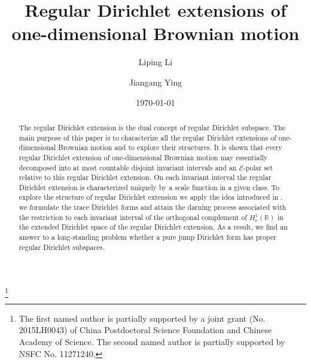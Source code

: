 \documentclass[a4paper]{amsart}
\theoremstyle{definition}
\theoremstyle{remark}
\numberwithin{equation}{section}
\begin{document}
\title[Regular Dirichlet extension]{Regular Dirichlet extensions of one-dimensional Brownian motion}

\author{ Liping Li}
\address{Institute of Applied Mathematics, Academy of Mathematics and Systems Science, Chinese Academy of Sciences, Beijing 100190, China.}
\thanks{The first named author is partially supported by a joint grant (No. 2015LH0043) of China Postdoctoral Science Foundation and Chinese Academy of Science. The second named author is partially supported by NSFC No. 11271240.}

\author{Jiangang Ying}
\address{School of Mathematical Sciences, Fudan University, Shanghai 200433, China.}


\date{\today}


\begin{abstract}
The regular Dirichlet extension is the dual concept of regular Dirichlet subspace. The main purpose of this paper is to characterize all the regular Dirichlet extensions of one-dimensional Brownian motion and to explore their structures. It is shown that every regular Dirichlet extension of one-dimensional Brownian motion may essentially decomposed into at most countable disjoint invariant intervals and an ${{\mathcal{E}}}$-polar set relative to this regular Dirichlet extension. On each invariant interval the regular Dirichlet extension is characterized uniquely by a scale function in a given class. To explore the structure of regular Dirichlet extension we apply the idea introduced in \cite{LY14}, we formulate the trace Dirichlet forms and attain the darning process associated with the restriction to each invariant interval of the orthogonal complement of $H^1_\mathrm{e}(\mathbb{R})$ in the extended Dirichlet space of the regular Dirichlet extension. As a result, we find an answer to a long-standing problem whether a pure jump Dirichlet form has proper regular Dirichlet subspaces.
\end{abstract}

\maketitle

\tableofcontents
\end{document}
